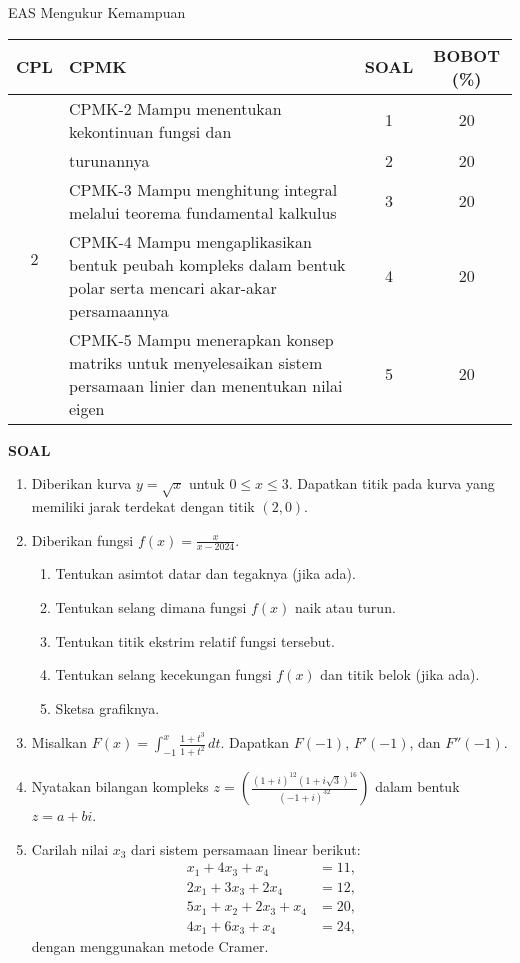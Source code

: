 \documentclass[10pt,openany,a4paper]{article}
\begin{document}
	\begin{table}[h]
        \centering
        EAS Mengukur Kemampuan
        \begin{tabular}{|c|m{10.5cm}|c|c|}
            \hline
            CPL & CPMK & SOAL & BOBOT (\%) \\ \hline
            \multirow{5}{*}{2} 
            & CPMK-2 Mampu menentukan kekontinuan fungsi dan & 1 & 20 \\ \cline{3-4}
            & turunannya & 2 & 20 \\\cline{2-4}
            & CPMK-3 Mampu menghitung integral melalui teorema fundamental kalkulus & 3 & 20 \\ \cline{2-4}
            & CPMK-4 Mampu mengaplikasikan bentuk peubah kompleks dalam bentuk polar serta mencari akar-akar persamaannya & 4 & 20 \\ \cline{2-4}
            & CPMK-5 Mampu menerapkan konsep matriks untuk menyelesaikan sistem persamaan linier dan menentukan nilai eigen & 5 & 20 \\ \hline
        \end{tabular}
    \end{table}
    {\centering\textbf{SOAL}}
    \begin{enumerate}
        \item Diberikan kurva $y = \sqrt{x}$ untuk $0 \leq x \leq 3$. Dapatkan titik pada kurva yang memiliki jarak terdekat dengan titik $(2, 0)$.
    
    \item Diberikan fungsi $f(x) = \displaystyle\frac{x}{x - 2024}$.
    \begin{enumerate}
        \item Tentukan asimtot datar dan tegaknya (jika ada).
        \item Tentukan selang dimana fungsi $f(x)$ naik atau turun.
        \item Tentukan titik ekstrim relatif fungsi tersebut.
        \item Tentukan selang kecekungan fungsi $f(x)$ dan titik belok (jika ada).
        \item Sketsa grafiknya.
    \end{enumerate}

    \item Misalkan $F(x) = \displaystyle\int_{-1}^x \frac{1 + t^3}{1 + t^2} \, dt$. Dapatkan $F(-1)$, $F'(-1)$, dan $F''(-1)$.

    \item Nyatakan bilangan kompleks $\displaystyle z = \left(\frac{\left(1 + i\right)^{12}\left(1 + i\sqrt{3}\right)^{16}}{(-1 + i)^{32}}\right)$ dalam bentuk $z = a + bi$.

    \item Carilah nilai $x_3$ dari sistem persamaan linear berikut:
    \begin{align*}
        x_1 + 4x_3 + x_4 &= 11, \\
        2x_1 + 3x_3 + 2x_4 &= 12, \\
        5x_1 + x_2 + 2x_3 + x_4 &= 20, \\
        4x_1 + 6x_3 + x_4 &= 24,
    \end{align*}
    dengan menggunakan metode Cramer.
    \end{enumerate}
\end{document}
